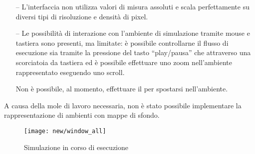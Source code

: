 \begin{itemize}
                  \item[--]
                      L'interfaccia non utilizza valori di misura assoluti e scala perfettamente su diversi tipi di risoluzione e densità di pixel.

                  \item[--]
                      Le possibilità di interazione con l'ambiente di simulazione tramite mouse e tastiera sono presenti, ma limitate: è possibile controllarne il flusso di esecuzione sia tramite la pressione del tasto ``play/pausa'' che attraverso una scorciatoia da tastiera ed è possibile effettuare uno zoom nell'ambiente rappresentato eseguendo uno scroll.

                      Non è possibile, al momento, effettuare il  per spostarsi nell'ambiente. %
                \end{itemize}

                A causa della mole di lavoro necessaria, non è stato possibile implementare la rappresentazione di ambienti con mappe di sfondo.

                \begin{figure}[htbp]
                    \centering
                    \texttt{[image: new/window\_all]}
                    \caption{Simulazione in corso di esecuzione}
                    \label{fig:simWithNodes}
                \end{figure}
